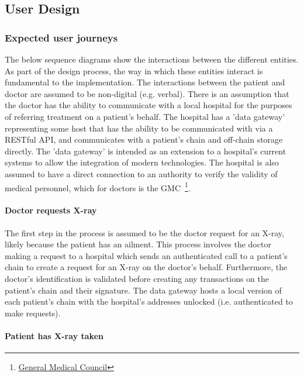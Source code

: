\subsection{User Design}

\subsubsection{Expected user journeys}

The below sequence diagrams show the interactions between the different entities. As part of the design process, the way in which these entities interact is fundamental to the implementation. The interactions between the patient and doctor are assumed to be non-digital (e.g. verbal). There is an assumption that the doctor has the ability to communicate with a local hospital for the purposes of referring treatment on a patient's behalf. The hospital has a 'data gateway' representing some host that has the ability to be communicated with via a RESTful API, and communicates with a patient's chain and off-chain storage directly. The 'data gateway' is intended as an extension to a hospital's current systems to allow the integration of modern technologies. The hospital is also assumed to have a direct connection to an authority to verify the validity of medical personnel, which for doctors is the GMC~\footnote{\href{http://www.gmc-uk.org/}{General Medical Council}}.

\paragraph{Doctor requests X-ray}

The first step in the process is assumed to be the doctor request for an X-ray, likely because the patient has an ailment. This process involves the doctor making a request to a hospital which sends an authenticated call to a patient's chain to create a request for an X-ray on the doctor's behalf. Furthermore, the doctor's identification is validated before creating any transactions on the patient's chain and their signature. The data gateway hosts a local version of each patient's chain with the hospital's addresses unlocked (i.e. authenticated to make requests).



\paragraph{Patient has X-ray taken}

